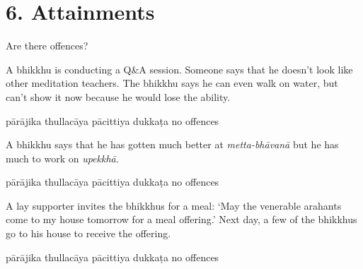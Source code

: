 \chapter{6. Attainments}
\renewcommand*{\theChapterTitle}{6. Attainments}

\begin{exam}{\autoExamName}

\begin{problem*}

  Are there offences?

\begin{parts}

\item A bhikkhu is conducting a Q\&A session.
  Someone says that he doesn't look like other meditation teachers.
  The bhikkhu says he can even walk on water, but can't show it now because he would lose the ability.

  \bigskip

  \begin{answers}{5}
    \bChoices
     pārājika\eAns
     thullacāya\eAns
     pācittiya\eAns
     dukkaṭa\eAns
     no offences\eAns
    \eChoices
  \end{answers}

  \bigskip

\item A bhikkhu says that he has gotten much better at \emph{metta-bhāvanā} but
  he has much to work on \textit{upekkhā}.

  \bigskip

  \begin{answers}{5}
    \bChoices
     pārājika\eAns
     thullacāya\eAns
     pācittiya\eAns
     dukkaṭa\eAns
     no offences\eAns
    \eChoices
  \end{answers}

  \bigskip

\item A lay supporter invites the bhikkhus for a meal: `May the venerable
  arahants come to my house tomorrow for a meal offering.' Next day, a few of
  the bhikkhus go to his house to receive the offering.

  \bigskip

  \begin{answers}{5}
    \bChoices
     pārājika\eAns
     thullacāya\eAns
     pācittiya\eAns
     dukkaṭa\eAns
     no offences\eAns
    \eChoices
  \end{answers}


\end{parts}
\end{problem*}
\end{exam}
